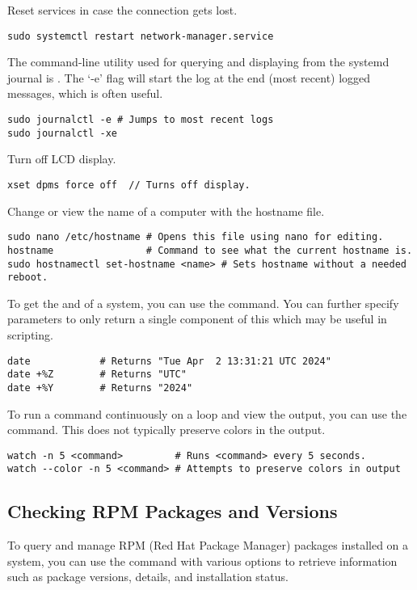 Reset  services in case the connection gets lost.
\begin{lstlisting}
sudo systemctl restart network-manager.service
\end{lstlisting}

The command-line utility used for querying and displaying  from the systemd journal is . The `-e' flag will start the log at the end (most recent) logged messages, which is often useful.
\begin{lstlisting}
sudo journalctl -e # Jumps to most recent logs
sudo journalctl -xe
\end{lstlisting}

Turn off LCD display.
\begin{lstlisting}
xset dpms force off  // Turns off display.
\end{lstlisting}

Change or view the  name of a computer with the hostname file.
\begin{lstlisting}
sudo nano /etc/hostname # Opens this file using nano for editing.
hostname                # Command to see what the current hostname is.
sudo hostnamectl set-hostname <name> # Sets hostname without a needed reboot.
\end{lstlisting}

To get the  and  of a system, you can use the  command. You can further specify parameters to only return a single component of this which may be useful in scripting.
\begin{lstlisting}
date            # Returns "Tue Apr  2 13:31:21 UTC 2024"
date +%Z        # Returns "UTC"
date +%Y        # Returns "2024"
\end{lstlisting}

To run a command continuously on a loop and view the output, you can use the  command. This does not typically preserve colors in the output.
\begin{lstlisting}
watch -n 5 <command>         # Runs <command> every 5 seconds.
watch --color -n 5 <command> # Attempts to preserve colors in output
\end{lstlisting}

\subsection{Checking RPM Packages and Versions}
To query and manage RPM (Red Hat Package Manager) packages installed on a system, you can use the  command with various options to retrieve information such as package versions, details, and installation status.

